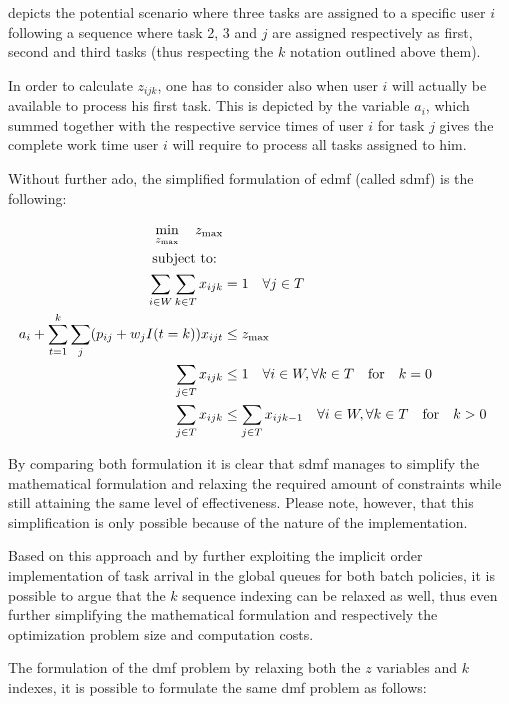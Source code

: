 \documentclass[draft=false]{seal_thesis}
\begin{document}
 depicts the potential scenario where three tasks are assigned to a specific user $i$ following a sequence where task 2, 3 and $j$ are assigned respectively as first, second and third tasks (thus respecting the $k$ notation outlined above them).

In order to calculate $z_{ijk}$, one has to consider also when user $i$ will actually be available to process his first task. This is depicted by the variable $a_i$, which summed together with the respective service times of user $i$ for task $j$ gives the complete work time user $i$ will require to process all tasks assigned to him.


Without further ado, the simplified formulation of \gls{edmf} (called \gls{sdmf}) is the following:

\begin{align}
    \min_{z_{\text{max}}} \quad z_{\text{max}}\\
    \text{subject to: } \notag \\
    \sum_{i \in W} \sum_{k \in T} x_{ijk} &= 1 \quad \forall j \in T\\
    a_i + \sum_{t=1}^k \sum_j (p_{ij} + w_j I(t=k))x_{ijt} &\leq z_{\text{max}}\\
    \sum_{j \in T} x_{ijk} &\leq 1 \quad \forall i \in W, \forall k \in T \quad \text{for} \quad k=0\\
    \sum_{j \in T} x_{ijk} &\leq \sum_{j \in T} x_{ijk-1} \quad \forall i \in W, \forall k \in T \quad \text{for} \quad k>0
\end{align}

By comparing both formulation it is clear that \gls{sdmf} manages to simplify the mathematical formulation and relaxing the required amount of constraints while still attaining the same level of effectiveness. Please note, however, that this simplification is only possible because of the nature of the implementation.

Based on this approach and by further exploiting the implicit order implementation of task arrival in the global queues for both batch policies, it is possible to argue that the $k$ sequence indexing can be relaxed as well, thus even further simplifying the mathematical formulation and respectively the optimization problem size and computation costs.

The formulation of the \gls{dmf} problem by relaxing both the $z$ variables and $k$ indexes, it is possible to formulate the same \gls{dmf} problem as follows:
\end{document}
